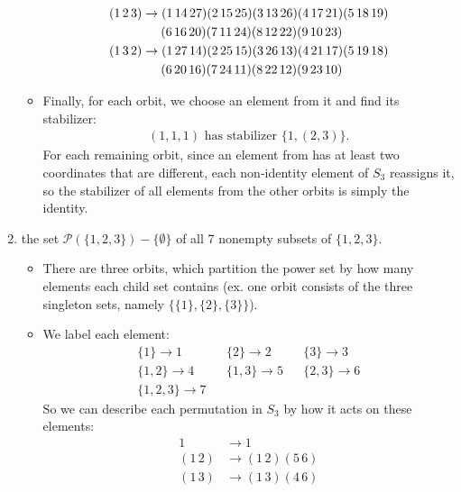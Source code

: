 \documentclass{article}
\begin{document}
\begin{enumerate}[itemsep=0em,label=(\alph*)]
\begin{itemize}[itemsep=0em]
\begin{align*}
                (1\,2\,3) &\rightarrow (1\,14\,27)(2\,15\,25)(3\,13\,26)(4\,17\,21)(5\,18\,19)\\ &\hspace{1.5em}(6\,16\,20)(7\,11\,24)(8\,12\,22)(9\,10\,23) \\
                (1\,3\,2) &\rightarrow (1\,27\,14)(2\,25\,15)(3\,26\,13)(4\,21\,17)(5\,19\,18)\\ &\hspace{1.5em}(6\,20\,16)(7\,24\,11)(8\,22\,12)(9\,23\,10)
            \end{align*}
            \item Finally, for each orbit, we choose an element from it and find its stabilizer:
            \begin{align*}
                (1, 1, 1) \text{ has stabilizer } \{ 1, (2, 3) \}.
            \end{align*}
            For each remaining orbit, since an element from has at least two coordinates that are different, each non-identity element of $S_3$ reassigns it, so the stabilizer of all elements from the other orbits is simply the identity.
        \end{itemize}
    \item the set $\mathcal{P}(\{ 1, 2, 3 \}) - \{ \emptyset \}$ of all 7 nonempty subsets of $\{ 1, 2, 3 \}$.
        \begin{itemize}[itemsep=0em]
            \item There are three orbits, which partition the power set by how many elements each child set contains (ex. one orbit consists of the three singleton sets, namely $\{ \{1\}, \{2\}, \{3\} \}$).
            \item We label each element:
            \begin{align*}
                \{ 1 \} \rightarrow 1 & & \{ 2 \} \rightarrow 2 & & \{ 3 \} \rightarrow 3 \\
                \{ 1, 2 \} \rightarrow 4 & & \{ 1, 3 \} \rightarrow 5 & & \{ 2, 3 \} \rightarrow 6 \\
                \{ 1, 2, 3 \} \rightarrow 7
            \end{align*}
            So we can describe each permutation in $S_3$ by how it acts on these elements:
            \begin{align*}
                1 &\rightarrow 1 \\
                (1\,2) &\rightarrow (1\,2)(5\,6) \\
                (1\,3) &\rightarrow (1\,3)(4\,6) \\

\end{align*}
\end{itemize}
\end{enumerate}
\end{document}
